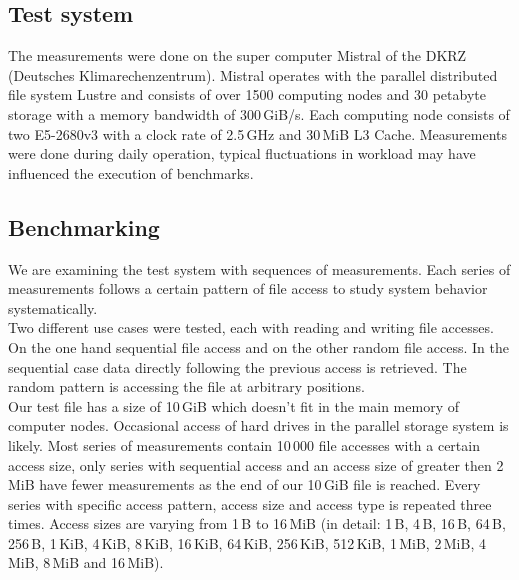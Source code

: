 \documentclass{superfri}
\begin{document}
\subsection{Test system}
The measurements were done on the super computer Mistral of the DKRZ (Deutsches Klimarechenzentrum).
Mistral operates with the parallel distributed file system Lustre and consists of over 1500 computing nodes and 30 petabyte storage with a memory bandwidth of 300\,GiB/s.
Each computing node consists of two E5-2680v3 with a clock rate of 2.5\,GHz and 30\,MiB L3 Cache.
Measurements were done during daily operation, typical fluctuations in workload may have influenced the execution of benchmarks.

\subsection{Benchmarking}
We are examining the test system with sequences of measurements.
Each series of measurements follows a certain pattern of file access to study system behavior systematically.\\
Two different use cases were tested, each with reading and writing file accesses.
On the one hand sequential file access and on the other random file access.
In the sequential case data directly following the previous access is retrieved.
The random pattern is accessing the file at arbitrary positions.\\
Our test file has a size of 10\,GiB which doesn't fit in the main memory of computer nodes.
Occasional access of hard drives in the parallel storage system is likely.
Most series of measurements contain 10\,000 file accesses with a certain access size, only series with sequential access and an access size of greater then 2\,MiB have fewer measurements as the end of our 10\,GiB file is reached.
Every series with specific access pattern, access size and access type is repeated three times.
Access sizes are varying from 1\,B to 16\,MiB (in detail:  1\,B, 4\,B, 16\,B, 64\,B, 256\,B, 1\,KiB, 4\,KiB, 8\,KiB, 16\,KiB, 64\,KiB, 256\,KiB, 512\,KiB, 1\,MiB, 2\,MiB, 4\,MiB, 8\,MiB and 16\,MiB).
\end{document}
